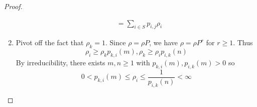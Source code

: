 \documentclass[a4paper]{article}
\begin{document}
\begin{proof}
\begin{enumerate}
\begin{align*}
             &= \sum_{i \in S}^{ }p_{i,j} \rho_i
    \end{align*}
  \item Pivot off the fact that \(\rho_k = 1\). Since \(\rho = \rho P\), we have \(\rho = \rho P^r\) for \(r \geq 1\). Thus
    \[
      \rho_i \geq \rho_k p_{k, i}(m), \rho_k \geq \rho_i p_{i, k}(n)
    \]
    By irreducibility, there exists \(m, n \geq 1\) with \(p_{k, i}(m), p_{i, k}(m) > 0\) so
    \[
      0 < p_{k, i}(m) \leq \rho_i \leq \frac{1}{p_{i, k}(n)} < \infty
    \]
  \end{enumerate}
\end{proof}
\iffalse
\appendix

\section{Resources}


Reading list: Probability, an introduction Grimmet, Welsh, 2nd edition, Chapter 12

\fi
\end{document}
